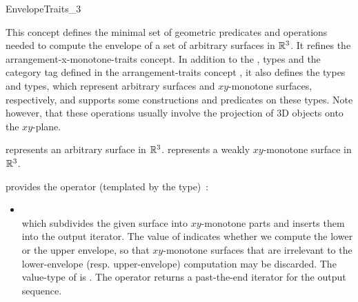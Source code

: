 \ccRefPageBegin

\begin{ccRefConcept}{EnvelopeTraits_3}

\ccDefinition

This concept defines the minimal set of geometric predicates and
operations needed to compute the envelope of a set of arbitrary
surfaces in $\mathbb{R}^3$. It refines the arrangement-x-monotone-traits concept.
In addition to the  ,  types and the
 category tag defined in the arrangement-traits concept ,
it also defines the types  and 
types, which represent arbitrary surfaces and $xy$-monotone surfaces,
respectively, and supports some constructions and predicates on these
types. Note however, that these operations usually involve the
projection of 3D objects onto the $xy$-plane.

\ccRefines
{}

\ccTypes

{represents an arbitrary surface in $\mathbb{R}^3$.}
\ccGlue
{}
{represents a weakly $xy$-monotone surface in $\mathbb{R}^3$.}


\ccThreeToTwo

{provides the operator (templated by the  type)~:
 \begin{itemize}
 \item {} \\
 which subdivides the given surface  into $xy$-monotone parts
 and inserts them into the output iterator. The value of
  indicates whether we compute the lower or the upper
 envelope, so that $xy$-monotone surfaces that are irrelevant to the
 lower-envelope (resp. upper-envelope) computation may be discarded.
 The value-type of  is .
 The operator returns a past-the-end iterator for the output sequence.
 \end{itemize}}


\end{ccRefConcept}
